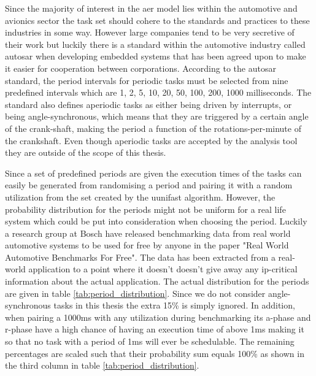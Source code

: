 \documentclass{kththesis}
\begin{document}
Since the majority of interest in the \acrshort{aer} model lies within the automotive and avionics
sector the task set should cohere to the standards and practices to these industries in some way.
However large companies tend to be very secretive of their work but luckily there is a standard
within the automotive industry called \acrshort{autosar} when developing embedded systems that has
been agreed upon to make it easier for cooperation between corporations. According to the
\acrshort{autosar} standard, the period intervals for periodic tasks must be selected from nine
predefined intervals which are 1, 2, 5, 10, 20, 50, 100, 200, 1000 milliseconds. The standard also
defines aperiodic tasks as either being driven by interrupts, or being angle-synchronous, which
means that they are triggered by a certain angle of the crank-shaft, making the period a function of
the rotations-per-minute of the crankshaft. Even though aperiodic tasks are accepted by the analysis
tool they are outside of the scope of this thesis.

Since a set of predefined periods are given the execution times of the tasks can easily be generated
from randomising a period and pairing it with a random utilization from the set created by the
uunifast algorithm. However, the probability distribution for the periods might not be uniform for a
real life system which could be put into consideration when choosing the period. Luckily a research
group at Bosch have released benchmarking data from real world automotive systems to be used for
free by anyone in the paper "Real World Automotive Benchmarks For Free"\parencite{kramer_real_2015}.
The data has been extracted from a real-world application to a point where it doesn't doesn't give
away any \acrshort{ip}-critical information about the actual application. The actual distribution
for the periods are given in table \ref{tab:period_distribution}. Since we do not consider
angle-synchronous tasks in this thesis the extra 15\% is simply ignored. In addition, when pairing
a 1000ms with any utilization during benchmarking its \acrshort{a}-phase and \acrshort{r}-phase have
a high chance of having an execution time of above 1ms making it so that no task with a period of
1ms will ever be schedulable. The remaining percentages are scaled such that their probability sum
equals 100\% as shown in the third column in table \ref{tab:period_distribution}.
\end{document}
